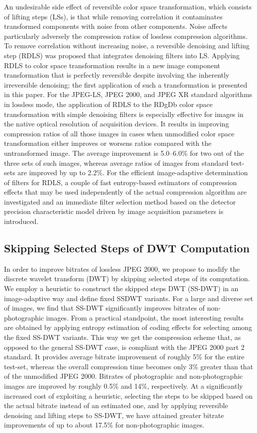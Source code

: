 An undesirable side effect of reversible color space transformation, which consists
of lifting steps (LSs), is that while removing correlation it contaminates transformed
components with noise from other components. Noise affects particularly
adversely the compression ratios of lossless compression algorithms. To remove
correlation without increasing noise, a reversible denoising and lifting step
(RDLS) was proposed that integrates denoising filters into LS. Applying RDLS
to color space transformation results in a new image component transformation
that is perfectly reversible despite involving the inherently irreversible denoising;
the first application of such a transformation is presented in this paper. For the
JPEG-LS, JPEG 2000, and JPEG XR standard algorithms in lossless mode, the
application of RDLS to the RDgDb color space transformation with simple
denoising filters is especially effective for images in the native optical resolution
of acquisition devices. It results in improving compression ratios of all those
images in cases when unmodified color space transformation either improves or
worsens ratios compared with the untransformed image. The average improvement
is 5.0–6.0\% for two out of the three sets of such images, whereas average ratios
of images from standard test-sets are improved by up to 2.2\%. For the efficient
image-adaptive determination of filters for RDLS, a couple of fast entropy-based
estimators of compression effects that may be used independently of the actual
compression algorithm are investigated and an immediate filter selection method
based on the detector precision characteristic model driven by image acquisition
parameters is introduced. \cite{denoising}

\subsection{Skipping Selected Steps of DWT Computation}

In order to improve bitrates of lossless JPEG 2000, we propose to modify the discrete wavelet
transform (DWT) by skipping selected steps of its computation. We employ a heuristic to
construct the skipped steps DWT (SS-DWT) in an image-adaptive way and define fixed SSDWT
variants. For a large and diverse set of images, we find that SS-DWT significantly
improves bitrates of non-photographic images. From a practical standpoint, the most interesting
results are obtained by applying entropy estimation of coding effects for selecting
among the fixed SS-DWT variants. This way we get the compression scheme that, as
opposed to the general SS-DWT case, is compliant with the JPEG 2000 part 2 standard. It
provides average bitrate improvement of roughly 5\% for the entire test-set, whereas the
overall compression time becomes only 3\% greater than that of the unmodified JPEG 2000.
Bitrates of photographic and non-photographic images are improved by roughly 0.5\% and
14\%, respectively. At a significantly increased cost of exploiting a heuristic, selecting the
steps to be skipped based on the actual bitrate instead of an estimated one, and by applying
reversible denoising and lifting steps to SS-DWT, we have attained greater bitrate improvements
of up to about 17.5\% for non-photographic images. \cite{skipping_dwt}

